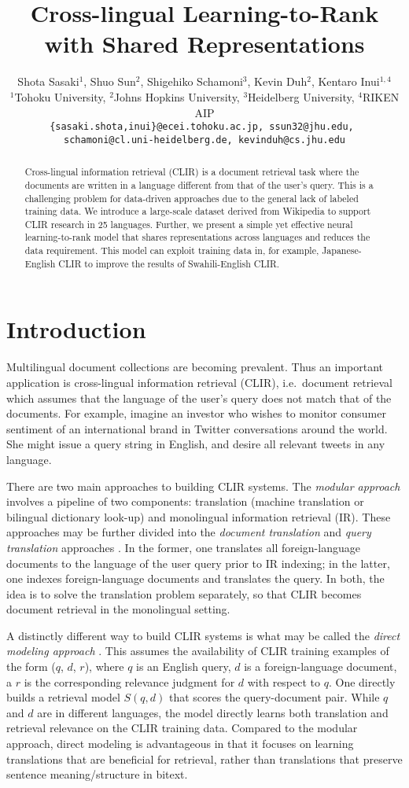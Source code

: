 \documentclass[11pt,a4paper]{article}
\title{Cross-lingual Learning-to-Rank with Shared Representations}
\author{Shota Sasaki$^{1}$, Shuo Sun$^{2}$, Shigehiko Schamoni$^{3}$, Kevin Duh$^{2}$, Kentaro Inui$^{1,4}$\\
  $^{1}$Tohoku University, $^{2}$Johns Hopkins University, $^{3}$Heidelberg University, $^{4}$RIKEN AIP\\
  {\tt \{sasaki.shota,inui\}@ecei.tohoku.ac.jp, ssun32@jhu.edu, }\\
  {\tt schamoni@cl.uni-heidelberg.de, kevinduh@cs.jhu.edu}
  }
\date{}
\begin{document}
\maketitle
\begin{abstract}
  Cross-lingual information retrieval (CLIR) is a document retrieval task where the documents are written in a language different from that of the user's query.
  This is a challenging problem for data-driven approaches due to the general lack of labeled training data.
  We introduce a large-scale dataset derived from Wikipedia to support CLIR research in 25 languages. 
  Further, we present a simple yet effective neural learning-to-rank model that shares representations across languages and reduces the data requirement. 
  This model can exploit training data in, for example, Japanese-English CLIR to improve the results of Swahili-English CLIR. 
\end{abstract}


\section{Introduction}

Multilingual document collections are becoming prevalent. 
Thus an important application is cross-lingual information retrieval (CLIR), i.e.~document retrieval which assumes that the language of the user's query does not match that of the documents. 
For example, imagine an investor who wishes to monitor consumer sentiment of an international brand in Twitter conversations around the world. 
She might issue a query string in English, and desire all relevant tweets in any language.

There are two main approaches to building CLIR systems. 
The \textit{modular approach} involves a pipeline of two components: translation (machine translation or bilingual dictionary look-up) and monolingual information retrieval (IR). 
These approaches may be further divided into the \textit{document translation} and \textit{query translation} approaches \cite{nie10clirbook}.
In the former, one translates all foreign-language documents to the language of the user query prior to IR indexing;
in the latter, one indexes foreign-language documents and translates the query.
In both, the idea is to solve the translation problem separately, so that CLIR becomes document retrieval in the monolingual setting. 

A distinctly different way to build CLIR systems is what may be called the \textit{direct modeling approach} \cite{bai10features,sokolov13boosting}.
This assumes the availability of CLIR training examples of the form ($q$, $d$, $r$), where $q$ is an English query, $d$ is a foreign-language document, a $r$ is the corresponding relevance judgment for $d$ with respect to $q$. 
One directly builds a retrieval model $S(q,d)$ that scores the query-document pair.
While $q$ and $d$ are in different languages, the model directly learns both translation and retrieval relevance on the CLIR training data. 
Compared to the modular approach, direct modeling is advantageous in that it focuses on learning translations that are beneficial for retrieval, rather than translations that preserve sentence meaning/structure in bitext.
\end{document}
